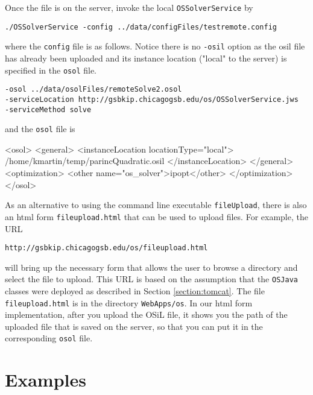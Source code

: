 \documentclass[11pt]{article}
\renewcommand{\_}{{\char"5F}}
\renewcommand{\{}{{\char"7B}}
\renewcommand{\}}{{\char"7D}}
\renewcommand{\^}{{\char"0D}}
\renewcommand{\'}{{\char"0D}}
\begin{document}
Once the file is on the server, invoke the local {\tt OSSolverService} by
\begin{verbatim}
./OSSolverService -config ../data/configFiles/testremote.config
\end{verbatim}
where the {\tt config} file is as follows. Notice there is no {\tt -osil}  option as the osil file has already been uploaded and its instance location ("local" to the server) is specified in the {\tt osol} file.
\begin{verbatim}
-osol ../data/osolFiles/remoteSolve2.osol
-serviceLocation http://gsbkip.chicagogsb.edu/os/OSSolverService.jws
-serviceMethod solve
\end{verbatim}
and the {\tt osol} file is
\begin{verbatimtab}[5]
<osol>
    <general>
         <instanceLocation locationType="local">
         	/home/kmartin/temp/parincQuadratic.osil
         </instanceLocation>
    </general>
    <optimization>
    	<other name="os_solver">ipopt</other>
    </optimization>
</osol>
\end{verbatimtab}

As an alternative to using the command line executable {\tt fileUpload}, there is also an html form {\tt fileupload.html} that can be used to upload files. For example, the URL
\begin{verbatim}
http://gsbkip.chicagogsb.edu/os/fileupload.html
\end{verbatim}
will bring up the necessary form that allows the user to browse a directory and select the file to upload. This URL is based on the assumption that the {\tt OSJava} classes were deployed as described in Section \ref{section:tomcat}. The file {\tt fileupload.html} is in the directory {\tt WebApps/os}. In our html form implementation, after you upload the OSiL file, it shows you the path of the uploaded file that is saved on the server, so that you can put it in the corresponding {\tt osol} file.



\section{Examples}\label{section:examples}
\end{document}
